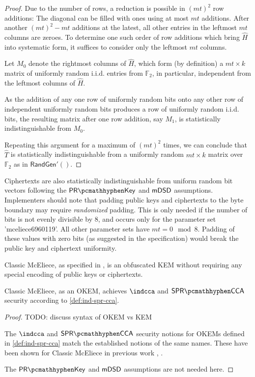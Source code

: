\begin{proof}
    Due to the number of rows, a reduction is possible in $(mt)^2$ row additions: The diagonal can be filled with ones using at most $mt$ additions. After another $(mt)^2-mt$ additions at the latest, all other entries in the leftmost $mt$ columns are zeroes. To determine one such order of row additions which bring $\hat H$ into systematic form, it suffices to consider only the leftmost $mt$ columns.
    
    Let $M_0$ denote the rightmost columns of $\hat H$, which form (by definition) a $mt \times k$ matrix of uniformly random i.i.d. entries from $\mathbb F_2$, in particular, independent from the leftmost columns of $\hat H$.
    
    As the addition of any one row of uniformly random bits onto any other row of independent uniformly random bits produces a row of uniformly random i.i.d. bits, the resulting matrix after one row addition, say $M_1$, is statistically indistinguishable from $M_0$.
    
    Repeating this argument for a maximum of $(mt)^2$ times, we can conclude that $\hat T$ is statistically indistinguishable from a uniformly random $mt \times k$ matrix over $\mathbb F_2$ as in $\textsf{RandGen}'()$.
\end{proof}

Ciphertexts are also statistically indistinguishable from uniform random bit vectors following the $\prkey$ and $\mathsf{mDSD}$ assumptions. Implementers should note that padding public keys and ciphertexts to the byte boundary may require \emph{randomized} padding. This is only needed if the number of bits is not evenly divisible by 8, and occurs only for the parameter set 'mceliece6960119'.  All other parameter sets have $mt = 0 \mod 8$. Padding of these values with zero bits (as suggested in the specification) would break the public key and ciphertext uniformity.

\begin{theorem}
    Classic McEliece, as specified in \cite{NISTPQC-R4:ClassicMcEliece22}, is an obfuscated KEM without requiring any special encoding of public keys or ciphertexts.

    Classic McEliece, as an OKEM, achieves $\indcca$ and $\sprcca$ security according to \cref{def:ind-spr-cca}.
\end{theorem}
\begin{proof}
    TODO: discuss syntax of OKEM vs KEM

    The $\indcca$ and $\sprcca$ security notions for OKEMs defined in \cref{def:ind-spr-cca} match the established notions of the same names. These have been shown for Classic McEliece in previous work \cite{EC:Xagawa22}, \cite[security.pdf: Section 5]{NISTPQC-R4:ClassicMcEliece22}.

    The $\prkey$ and $\mathsf{mDSD}$ assumptions are not needed here.
\end{proof}

